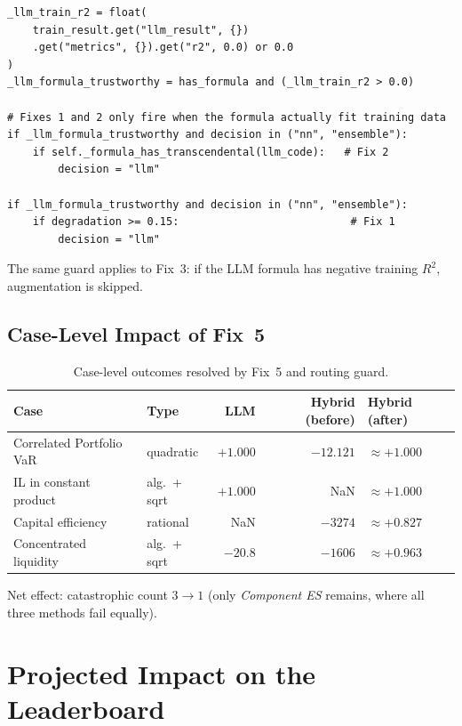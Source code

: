 \documentclass[twoside,11pt]{article}
\begin{document}
\begin{lstlisting}[caption={LLM-formula trustworthiness guard.}]
_llm_train_r2 = float(
    train_result.get("llm_result", {})
    .get("metrics", {}).get("r2", 0.0) or 0.0
)
_llm_formula_trustworthy = has_formula and (_llm_train_r2 > 0.0)

# Fixes 1 and 2 only fire when the formula actually fit training data
if _llm_formula_trustworthy and decision in ("nn", "ensemble"):
    if self._formula_has_transcendental(llm_code):   # Fix 2
        decision = "llm"

if _llm_formula_trustworthy and decision in ("nn", "ensemble"):
    if degradation >= 0.15:                           # Fix 1
        decision = "llm"
\end{lstlisting}

The same guard applies to Fix~3: if the LLM formula has negative training
$R^2$, augmentation is skipped.

\subsection{Case-Level Impact of Fix~5}

\begin{table}[h]
\centering
\caption{Case-level outcomes resolved by Fix~5 and routing guard.}
\label{tab:fix5_cases}
\begin{tabular}{llrrl}
\toprule
\textbf{Case} & \textbf{Type} & \textbf{LLM} & \textbf{Hybrid (before)} & \textbf{Hybrid (after)} \\
\midrule
Correlated Portfolio VaR & quadratic     & $+1.000$ & $-12.121$ & $\approx+1.000$ \\
IL in constant product   & alg.\ + sqrt  & $+1.000$ & NaN       & $\approx+1.000$ \\
Capital efficiency       & rational      & NaN      & $-3274$   & $\approx+0.827$ \\
Concentrated liquidity   & alg.\ + sqrt  & $-20.8$  & $-1606$   & $\approx+0.963$ \\
\bottomrule
\end{tabular}
\end{table}

Net effect: catastrophic count $3 \to 1$ (only \emph{Component ES} remains,
where all three methods fail equally).

\section{Projected Impact on the Leaderboard}
\label{sec:leaderboard}
\end{document}
